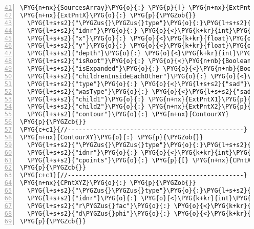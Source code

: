\begin{Verbatim}[commandchars=\\\{\},numbers=left,firstnumber=41,stepnumber=1,codes={\catcode`\$=3\catcode`\^=7\catcode`\_=8}]
\PYG{n+nx}{SourcesArray}\PYG{o}{:} \PYG{p}{[} \PYG{n+nx}{ExtPnt1}\PYG{p}{,} \PYG{n+nx}{ExtPnt2}\PYG{p}{,} \PYG{p}{.}\PYG{p}{.}\PYG{p}{.} \PYG{p}{]}
\PYG{n+nx}{ExtPntX}\PYG{o}{:} \PYG{p}{\PYGZob{}}
  \PYG{l+s+s2}{"\PYGZus{}\PYGZus{}type"}\PYG{o}{:}\PYG{l+s+s2}{"extpnt"}\PYG{p}{,}
  \PYG{l+s+s2}{"idnr"}\PYG{o}{:} \PYG{o}{<}\PYG{k+kr}{int}\PYG{o}{>}\PYG{p}{,}
  \PYG{l+s+s2}{"x"}\PYG{o}{:} \PYG{o}{<}\PYG{k+kr}{float}\PYG{o}{>}\PYG{p}{,}
  \PYG{l+s+s2}{"y"}\PYG{o}{:} \PYG{o}{<}\PYG{k+kr}{float}\PYG{o}{>}\PYG{p}{,}
  \PYG{l+s+s2}{"depth"}\PYG{o}{:} \PYG{o}{<}\PYG{k+kr}{int}\PYG{o}{>}\PYG{p}{,}
  \PYG{l+s+s2}{"isRoot"}\PYG{o}{:} \PYG{o}{<}\PYG{n+nb}{Boolean}\PYG{o}{>}\PYG{p}{,}
  \PYG{l+s+s2}{"isExpanded"}\PYG{o}{:} \PYG{o}{<}\PYG{n+nb}{Boolean}\PYG{o}{>}\PYG{p}{,}
  \PYG{l+s+s2}{"childrenInsideEachOther"}\PYG{o}{:} \PYG{o}{<}\PYG{n+nb}{Boolean}\PYG{o}{>}\PYG{p}{,}
  \PYG{l+s+s2}{"type"}\PYG{o}{:} \PYG{o}{<}\PYG{l+s+s2}{"sad"}\PYG{o}{|}\PYG{l+s+s2}{"min"}\PYG{o}{|}\PYG{l+s+s2}{"max"}\PYG{o}{>}\PYG{p}{,}
  \PYG{l+s+s2}{"wasType"}\PYG{o}{:} \PYG{o}{<}\PYG{l+s+s2}{"sad"}\PYG{o}{|}\PYG{l+s+s2}{"min"}\PYG{o}{|}\PYG{l+s+s2}{"max"}\PYG{o}{>}\PYG{p}{,}
  \PYG{l+s+s2}{"child1"}\PYG{o}{:} \PYG{n+nx}{ExtPntX1}\PYG{p}{,}
  \PYG{l+s+s2}{"child2"}\PYG{o}{:} \PYG{n+nx}{ExtPntX2}\PYG{p}{,}
  \PYG{l+s+s2}{"contour"}\PYG{o}{:} \PYG{n+nx}{ContourXY}
\PYG{p}{\PYGZcb{}}
\PYG{c+c1}{//------------------------------------------------}
\PYG{n+nx}{ContourXY}\PYG{o}{:} \PYG{p}{\PYGZob{}}
  \PYG{l+s+s2}{"\PYGZus{}\PYGZus{}type"}\PYG{o}{:}\PYG{l+s+s2}{"contour"}\PYG{p}{,}
  \PYG{l+s+s2}{"idnr"}\PYG{o}{:} \PYG{o}{<}\PYG{k+kr}{int}\PYG{o}{>}\PYG{p}{,}
  \PYG{l+s+s2}{"cpoints"}\PYG{o}{:} \PYG{p}{[} \PYG{n+nx}{CPntXY1}\PYG{p}{,} \PYG{n+nx}{CPntXY2}\PYG{p}{,} \PYG{p}{.}\PYG{p}{.}\PYG{p}{.} \PYG{p}{]}
\PYG{p}{\PYGZcb{}}
\PYG{c+c1}{//------------------------------------------------}
\PYG{n+nx}{CPntXYZ}\PYG{o}{:} \PYG{p}{\PYGZob{}}
  \PYG{l+s+s2}{"\PYGZus{}\PYGZus{}type"}\PYG{o}{:}\PYG{l+s+s2}{"cpnt"}\PYG{p}{,}
  \PYG{l+s+s2}{"idnr"}\PYG{o}{:} \PYG{o}{<}\PYG{k+kr}{int}\PYG{o}{>}\PYG{p}{,}
  \PYG{l+s+s2}{"r\PYGZus{}fac"}\PYG{o}{:} \PYG{o}{<}\PYG{k+kr}{float}\PYG{o}{>}\PYG{p}{,}
  \PYG{l+s+s2}{"d\PYGZus{}phi"}\PYG{o}{:} \PYG{o}{<}\PYG{k+kr}{float}\PYG{o}{>}
\PYG{p}{\PYGZcb{}}
\end{Verbatim}
